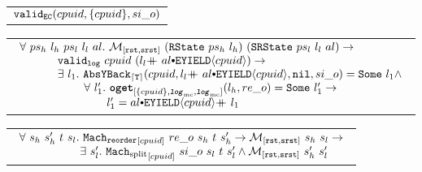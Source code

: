 \begin{hypothesis}
\begin{tabular}{P{0.95\textwidth}}
${{\mathrm{\texttt{valid}}}_{{\mathrm{\texttt{EC}}}}}({cpuid}, {\{cpuid\}}, {si\_o })$
\end{tabular}
\end{hypothesis}

\begin{hypothesis}
\begin{tabular}{P{0.95\textwidth}}
$
\begin{array}{l}
\forall \ ps_h \ l_h \ ps_l \ l_l \ al.\ \matchrstatesrstate{(\rstate{ps_h}{l_h})}{(\srstate{ps_l}{l_l}{al})} \rightarrow \\
\ \ \ \ \ \ \ \ \ \ \validlog{cpuid}{(\listconsoppo{\yieldev{cpuid}}{\listappoppo{al}{l_l}})} \rightarrow \\
\ \ \ \ \ \ \ \ \ \ \exists\ l_1. \ \yieldbackfunc{\timebound}{cpuid}{\listconsoppo{\yieldev{cpuid}}{\listappoppo{al}{l_l}}}{\nulllist}{si\_o}{l_1} \wedge \\ 
\ \ \ \ \ \ \ \ \ \ \ \ \ \ \ \ \ \forall \ l_1' .\  \oget{\set{cpuid}}{\mclog}{\mclog}{l_h}{re\_o}{l_1'} \rightarrow \\ 
\ \ \ \ \ \ \ \ \ \ \ \ \ \ \ \ \  \ \ \ \ \ \ l_1' = \listappoppo{l_1}{\listconsoppo{\yieldev{cpuid}}{al}} \\
\end{array}
$
\end{tabular}
\end{hypothesis}

\begin{lemma}
\begin{tabular}{P{0.95\textwidth}}
$
\begin{array}{l}
\forall \ s_h \ s_h' \ t \ s_l . \ \singlereorderstep{cpuid}{re\_o}{s_h}{t}{s_h'} \rightarrow  \matchrstatesrstate{s_h}{s_l} \rightarrow \\
\ \ \ \ \ \ \ \ \ \ \ \ \ \ \ \ \exists\ s_l' .\ \singlesplitstep{cpuid}{si\_o}{s_l}{t}{s_l'} \wedge  \matchrstatesrstate{s_h'}{s_l'}\\
\end{array}
$
\end{tabular}
\end{lemma}


